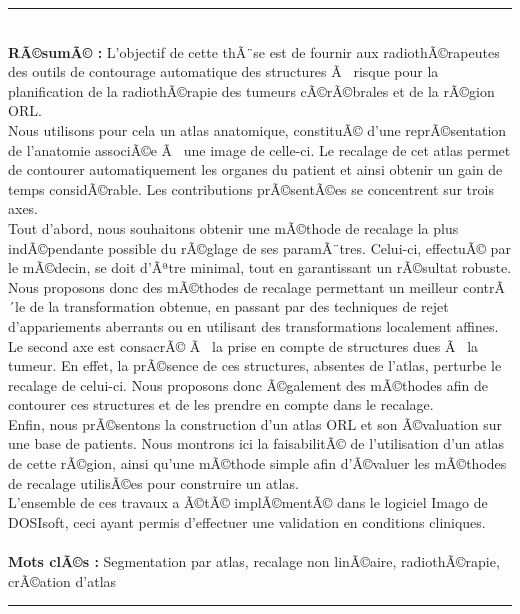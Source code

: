 \documentclass[a4paper,11pt,twoside]{StyleThese}
\begin{document}
\cleardoublepage
\begin{vcenterpage}
\noindent\rule[2pt]{\textwidth}{0.5pt}
\\
{\large\textbf{RÃ©sumÃ© :}}
L'objectif de cette thÃ¨se est de fournir aux radiothÃ©rapeutes des outils de contourage automatique des structures Ã  risque pour la planification de la radiothÃ©rapie des tumeurs cÃ©rÃ©brales et de la rÃ©gion ORL.
\\
Nous utilisons pour cela un atlas anatomique, constituÃ© d'une reprÃ©sentation de l'anatomie associÃ©e Ã  une image de celle-ci. Le recalage de cet atlas permet de contourer automatiquement les organes du patient et ainsi obtenir un gain de temps considÃ©rable. Les contributions prÃ©sentÃ©es se concentrent sur trois axes.
\\
Tout d'abord, nous souhaitons obtenir une mÃ©thode de recalage la plus indÃ©pendante possible du rÃ©glage de ses paramÃ¨tres. Celui-ci, effectuÃ© par le mÃ©decin, se doit d'Ãªtre minimal, tout en garantissant un rÃ©sultat robuste. Nous proposons donc des mÃ©thodes de recalage permettant un meilleur contrÃ´le de la transformation obtenue, en passant par des techniques de rejet d'appariements aberrants ou en utilisant des transformations localement affines.
\\
Le second axe est consacrÃ© Ã  la prise en compte de structures dues Ã  la tumeur. En effet, la prÃ©sence de ces structures, absentes de l'atlas, perturbe le recalage de celui-ci. Nous proposons donc Ã©galement des mÃ©thodes afin de contourer ces structures et de les prendre en compte dans le recalage.
\\
Enfin, nous prÃ©sentons la construction d'un atlas ORL et son Ã©valuation sur une base de patients. Nous montrons ici la faisabilitÃ© de l'utilisation d'un atlas de cette rÃ©gion, ainsi qu'une mÃ©thode simple afin d'Ã©valuer les mÃ©thodes de recalage utilisÃ©es pour construire un atlas.
\\
L'ensemble de ces travaux a Ã©tÃ© implÃ©mentÃ© dans le logiciel Imago de DOSIsoft, ceci ayant permis d'effectuer une validation en conditions cliniques.
\\
\\
{\large\textbf{Mots clÃ©s :}}
Segmentation par atlas, recalage non linÃ©aire, radiothÃ©rapie, crÃ©ation d'atlas
\\
\noindent\rule[2pt]{\textwidth}{0.5pt}
\end{vcenterpage}
\end{document}
